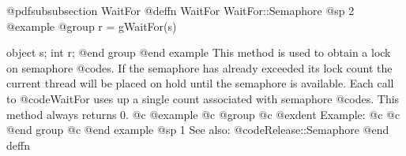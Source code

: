 @pdfsubsubsection {WaitFor}
@deffn {WaitFor} WaitFor::Semaphore
@sp 2
@example
@group
r = gWaitFor(s)

object  s;
int     r;
@end group
@end example
This method is used to obtain a lock on semaphore @code{s}.  If the
semaphore has already exceeded its lock count the current thread
will be placed on hold until the semaphore is available.  Each call
to @code{WaitFor} uses up a single count associated with semaphore
@code{s}.  This method always returns 0.
@c @example
@c @group
@c @exdent Example:
@c 
@c @end group
@c @end example
@sp 1
See also:  @code{Release::Semaphore}
@end deffn





